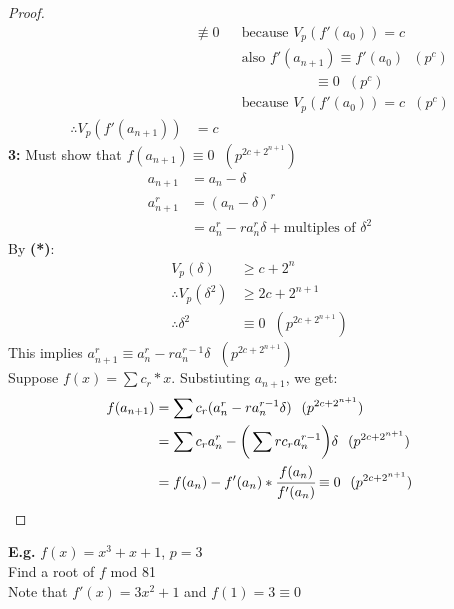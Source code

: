 \documentclass[11pt]{article}
\begin{document}
\begin{proof}
\begin{align*}
		&\not \equiv 0 &&\text{because } V_p(f'(a_0)) = c\\
		&&& \text{also } f'(a_{n+1}) \equiv f'(a_0) \hspace{7pt} (p^c)\\
		&&& \hspace{62pt} \equiv 0 \hspace{7pt} (p^c)\\[0.5em]
		&&& \text{because } V_p(f'(a_0)) = c \hspace{7pt} (p^c)\\[1em]
		\therefore V_p(f'(a_{n+1})) &=c 
	\end{align*}
	\textbf{3: } Must show that $f(a_{n+1}) \equiv 0 \hspace{7pt} (p^{2c+2^{n+1}})$
	\begin{align*}
	a_{n+1} &= a_n - \delta \\[1em]
		a_{n+1}^r &= (a_n -\delta)^r\\
		&= a_n^r - ra_n^r\delta +  \text{multiples of } \delta^2
	\end{align*}
	By \textbf{(*)}:
	\begin{align*}
		 V_p(\delta) &\geq c+2^n\\[1em]
		\therefore V_p(\delta^2) &\geq 2c + 2^{n+1}\\[1em]
		\therefore \delta^2 &\equiv 0 \hspace{7pt} (p^{2c+2^{n+1}})
	\end{align*}
	This implies $a^r_{n+1} \equiv a^r_n - ra^{r-1}_n \delta \hspace{7pt} (p^{2c+2^{n+1}})$\\

	Suppose $f(x) = \sum c_r * x$. Substiuting $a_{n+1}$, we get:
	\begin{align*}
		f(a_{n+1}) &= \sum c_r(a_n^r - ra^{r-1}_n \delta) \hspace{7pt} (p^{2c+2^{n+1}})\\
		&= \sum c_ra_n^r - \bigg(\sum rc_ra_n^{r-1} \bigg)\delta \hspace{7pt} (p^{2c+2^{n+1}})\\
		&= f(a_n) - f'(a_n) *\cfrac{f(a_n)}{f'(a_n)} \equiv 0 \hspace{7pt} (p^{2c+2^{n+1}})
	\end{align*}
\end{proof}
\newpage
\textbf{E.g.} $f(x) = x^3 + x + 1$, $p =3$\\
Find a root of $f$ mod 81\\[1em]
Note that $ f'(x) = 3x^2+1$ and $f(1) = 3 \equiv 0$\\[0.5em]
\end{document}

